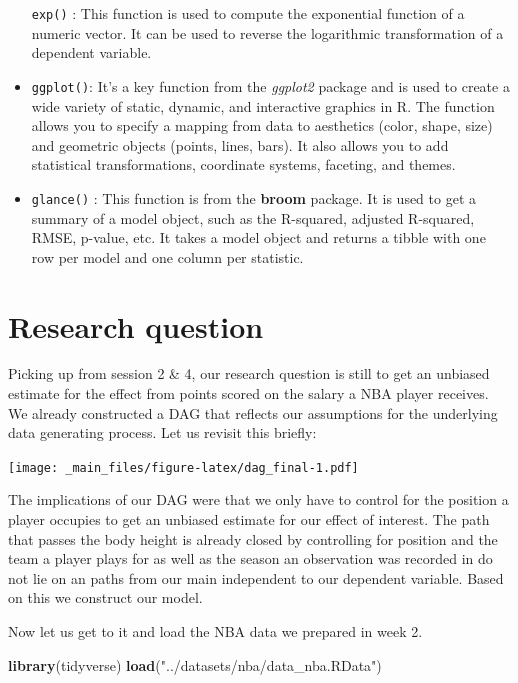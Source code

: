 \documentclass[
]{book}
\newenvironment{Shaded}{\begin{snugshade}}{\end{snugshade}}
\newcommand{\FunctionTok}[1]{\textcolor[rgb]{0.13,0.29,0.53}{\textbf{#1}}}
\newcommand{\NormalTok}[1]{#1}
\newcommand{\StringTok}[1]{\textcolor[rgb]{0.31,0.60,0.02}{#1}}
\begin{document}
\begin{itemize}
  \texttt{exp()} : This function is used to compute the exponential function of a numeric vector. It can be used to reverse the logarithmic transformation of a dependent variable.
\item
  \texttt{ggplot()}: It's a key function from the \emph{ggplot2} package and is used to create a wide variety of static, dynamic, and interactive graphics in R. The function allows you to specify a mapping from data to aesthetics (color, shape, size) and geometric objects (points, lines, bars). It also allows you to add statistical transformations, coordinate systems, faceting, and themes.
\item
  \texttt{glance()} : This function is from the \textbf{broom} package. It is used to get a summary of a model object, such as the R-squared, adjusted R-squared, RMSE, p-value, etc. It takes a model object and returns a tibble with one row per model and one column per statistic.
\end{itemize}

\hypertarget{research-question}{%
\section{Research question}\label{research-question}}

Picking up from session 2 \& 4, our research question is still to get an unbiased
estimate for the effect from points scored on the salary a NBA player receives.
We already constructed a DAG that reflects our assumptions for the underlying
data generating process. Let us revisit this briefly:

\texttt{[image: \_main\_files/figure-latex/dag\_final-1.pdf]}

The implications of our DAG were that we only have to control for the position
a player occupies to get an unbiased estimate for our effect of interest.
The path that passes the body height is already closed by controlling for
position and the team a player plays for as well as the season an observation
was recorded in do not lie on an paths from our main independent to our
dependent variable.
Based on this we construct our model.

Now let us get to it and load the NBA data we prepared in week 2.

\begin{Shaded}
\begin{Highlighting}[]
\FunctionTok{library}\NormalTok{(tidyverse)}
\FunctionTok{load}\NormalTok{(}\StringTok{"../datasets/nba/data\_nba.RData"}\NormalTok{)}
\end{Highlighting}
\end{Shaded}
\end{document}
